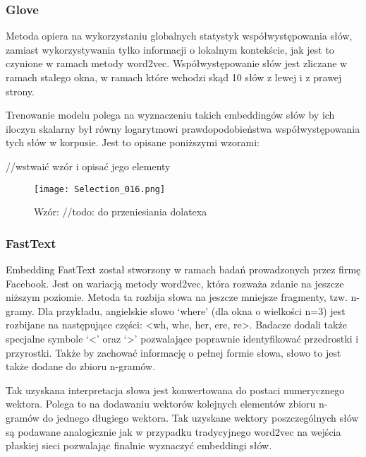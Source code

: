 \subsubsection{Glove}

Metoda opiera na wykorzystaniu globalnych statystyk współwystępowania słów, zamiast wykorzystywania tylko informacji o lokalnym kontekście, jak jest to czynione w ramach metody word2vec. Współwystępowanie słów jest zliczane w ramach stałego okna, w ramach które wchodzi skąd 10 słów z lewej i z prawej strony. 

Trenowanie modelu polega na wyznaczeniu takich embeddingów słów by ich iloczyn skalarny był równy logarytmowi prawdopodobieństwa współwystępowania tych słów w korpusie. Jest to opisane poniższymi wzorami: 

//wstwaić wzór i opisać jego elementy 

\begin{figure}[!h]
    \label{fig:wzor}
    \centering \texttt{[image: Selection\_016.png]}
    \caption{Wzór: //todo: do przeniesiania dolatexa}
\end{figure}

\subsubsection{FastText}

Embedding FastText został stworzony w ramach badań prowadzonych przez firmę Facebook. Jest on wariacją metody word2vec, która rozważa zdanie na jeszcze niższym poziomie. Metoda ta rozbija słowa na jeszcze mniejsze fragmenty, tzw. n-gramy. Dla przykładu, angielskie słowo ‘where’ (dla okna o wielkości n=3) jest rozbijane na następujące części: <wh, whe, her, ere, re>. Badacze dodali także specjalne symbole ‘<’ oraz ‘>’ pozwalające poprawnie identyfikować przedrostki i przyrostki. Także by zachować informację o pełnej formie słowa, słowo to jest także dodane do zbioru n-gramów. 

Tak uzyskana interpretacja słowa jest konwertowana do postaci numerycznego wektora. Polega to na dodawaniu wektorów kolejnych elementów zbioru n-gramów do jednego długiego wektora. Tak uzyskane wektory poszczególnych słów są podawane analogicznie jak w przypadku tradycyjnego word2vec na wejścia płaskiej sieci pozwalając finalnie wyznaczyć embeddingi słów. 


